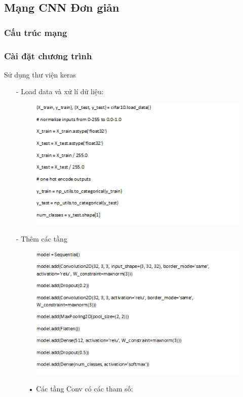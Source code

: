 \documentclass[a4paper,12pt]{report}
\begin{document}
\subsection{Mạng CNN Đơn giản}
\subsubsection{Cấu trúc mạng}
\subsubsection{Cài đặt chương trình}
Sử dụng thư viện keras
\begin{itemize}
\item[-] Load data và xử lí dữ liệu:
\begin{figure}[h]
\begin{center}
\includegraphics[width =0.7 \textwidth]{code1.png}
\end{center}
\end{figure}
\item[-] Thêm các tầng
\begin{figure}[h]
\begin{center}
\includegraphics[width =0.7 \textwidth]{code2.png}
\end{center}
\end{figure}
\begin{itemize}
\item[•] Các tầng Conv có các tham số:
\begin{itemize}

\end{itemize}
\end{itemize}
\end{itemize}
\end{document}
